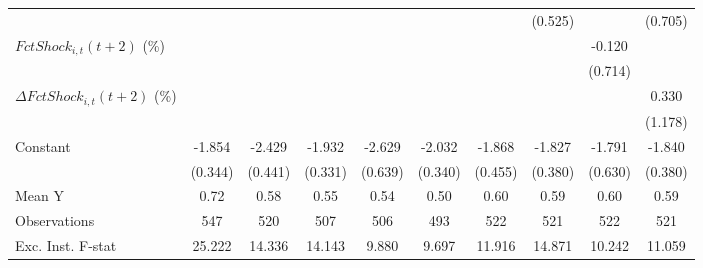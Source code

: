 {\begin{tabular}{l*{9}{c}}
                    &                     &                     &                     &                     &                     &                     &     (0.525)         &                     &     (0.705)         \\
\addlinespace
$ FctShock_{i,t}(t+2)$ (\%)&                     &                     &                     &                     &                     &                     &                     &      -0.120         &                     \\
                    &                     &                     &                     &                     &                     &                     &                     &     (0.714)         &                     \\
\addlinespace
$ \Delta FctShock_{i,t}(t+2)$ (\%)&                     &                     &                     &                     &                     &                     &                     &                     &       0.330         \\
                    &                     &                     &                     &                     &                     &                     &                     &                     &     (1.178)         \\
\addlinespace
Constant            &      -1.854\sym{***}&      -2.429\sym{***}&      -1.932\sym{***}&      -2.629\sym{***}&      -2.032\sym{***}&      -1.868\sym{***}&      -1.827\sym{***}&      -1.791\sym{***}&      -1.840\sym{***}\\
                    &     (0.344)         &     (0.441)         &     (0.331)         &     (0.639)         &     (0.340)         &     (0.455)         &     (0.380)         &     (0.630)         &     (0.380)         \\
\midrule
Mean Y              &        0.72         &        0.58         &        0.55         &        0.54         &        0.50         &        0.60         &        0.59         &        0.60         &        0.59         \\
Observations        &         547         &         520         &         507         &         506         &         493         &         522         &         521         &         522         &         521         \\
Exc. Inst. F-stat   &      25.222         &      14.336         &      14.143         &       9.880         &       9.697         &      11.916         &      14.871         &      10.242         &      11.059         \\
\bottomrule
\end{tabular}
}
